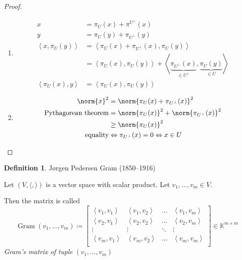 \documentclass[a4paper,landscape,twocolumn]{article}
\newcommand\functional[1]{\left\langle{#1}\right\rangle}
\theoremstyle{definition}
\newtheorem{defi}{Definition}
\DeclarePairedDelimiter\norm\lVert\rVert
\begin{document}
\begin{proof}
  \begin{enumerate}
    \item
      \begin{align*}
        x &= \pi_U(x) + \pi^{U^\bot}(x) \\
        y &= \pi_U(y) + \pi_{U^\bot}(y) \\
        \functional{x, \pi_U(y)} &= \functional{\pi_U(x) + \pi_{U^{\bot}}(x), \pi_U(y)} \\
          &= \functional{\pi_U(x), \pi_U(y)} + \functional{\underbrace{\pi_{U^\bot}(x)}_{\in U^\bot}, \underbrace{\pi_U(y)}_{\in U}} \\
        \functional{\pi_U(x), y} &= \functional{\pi_U(x), \pi_U(y)}
      \end{align*}
    \item
      \begin{align*}
        \norm{x}^2 &= \norm{\pi_U(x) + \pi_{U^\bot}(x)}^2 \\
        \text{Pythagorean theorem} &= \norm{\pi_U(x)}^2 + \norm{\pi_{U^\bot}(x)}^2 \\
          &\geq \norm{\pi_U(x)}^2 \\
        \text{equality} &\Leftrightarrow \pi_{U^\bot}(x) = 0 \Leftrightarrow x \in U
      \end{align*}
  \end{enumerate}
\end{proof}

\begin{defi}
  \label{defi-8.51}
  J\o rgen Pedersen Gram (1850--1916)

  Let $(V, \langle, \rangle)$ is a vector space with scalar product.
  Let $v_1, \ldots, v_m \in V$.

  Then the matrix is called
  \[
    \operatorname{Gram}(v_1, \ldots, v_m)
    \coloneqq \begin{bmatrix}
      \functional{v_1, v_1} & \functional{v_1, v_2} & \ldots & \functional{v_1, v_m} \\
      \functional{v_2, v_1} & \functional{v_2, v_2} & \ldots & \functional{v_2, v_m} \\
      \vdots & \vdots & \ddots & \vdots \\
      \functional{v_m, v_1} & \functional{v_m, v_2} & \ldots & \functional{v_m, v_m} \\
    \end{bmatrix}
    \in \mathbb K^{m \times m}
  \]
  \emph{Gram's matrix of tuple} $(v_1, \ldots, v_m)$
\end{defi}
\end{document}
